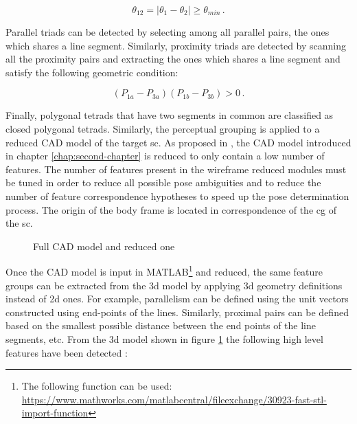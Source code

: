 \begin{equation}
  \theta_{12} = |\theta_1 - \theta_2| \geq \theta_{min} \,.
\end{equation}

Parallel triads can be detected by selecting among all parallel pairs, the ones which shares a line segment. Similarly, proximity triads are detected by scanning all the proximity pairs and extracting the ones which shares a line segment and satisfy the following geometric condition:

\begin{equation}
  (P_{1a} - P_{3a})(P_{1b}-P_{3b}) > 0 \,.
\end{equation}

Finally, polygonal tetrads that have two segments in common are classified as closed polygonal tetrads.
Similarly, the perceptual grouping is applied to a reduced CAD model of the target \acrshort{sc}. As proposed in \cite{Sharma2018}, the CAD model introduced in chapter \ref{chap:second-chapter} is reduced to only contain a low number of features. The number of features present in the wireframe reduced modules must be tuned in order to reduce all possible pose ambiguities and to reduce the number of feature correspondence hypotheses to speed up the pose determination process. The origin of the body frame is located in correspondence of the \acrshort{cg} of the \acrshort{sc}.

\begin{figure}[htbp]
  \centering
  \qquad
  \qquad
  \caption{Full CAD model and reduced one}
  \label{fig:cadModel}
\end{figure}

Once the CAD model is input in MATLAB\footnote{The following function can be used: \url{https://www.mathworks.com/matlabcentral/fileexchange/30923-fast-stl-import-function}} and reduced, the same feature groups can be extracted from the \acrshort{3d} model by applying \acrshort{3d} geometry definitions instead of \acrshort{2d} ones. For example, parallelism can be defined using the unit vectors constructed using end-points of the lines. Similarly, proximal pairs can be defined based on the smallest possible distance between the end points of the line segments, etc.
From the \acrshort{3d} model shown in figure \ref{fig:cadModel} the following high level features have been detected :

